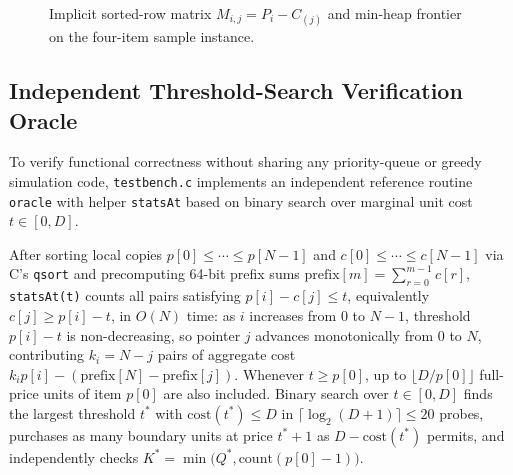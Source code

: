 \documentclass[10pt, a4paper]{article}
\newcommand{\code}[1]{\texttt{\color{primary!90!black}#1}}
\newcommand{\id}[1]{\ensuremath{\mathrm{#1}}}
\begin{document}
\begin{figure}[H]
\caption{\footnotesize Implicit sorted-row matrix $M_{i,j} = P_i - C_{(j)}$ and min-heap frontier on the four-item sample instance.}
\label{fig:frontier_trace}
\end{figure}

\subsection{Independent Threshold-Search Verification Oracle}
To verify functional correctness without sharing any priority-queue or greedy simulation code, \code{testbench.c} implements an independent reference routine \code{oracle} with helper \code{statsAt} based on binary search over marginal unit cost $t \in [0, D]$.

After sorting local copies $p[0] \le \cdots \le p[N-1]$ and $c[0] \le \cdots \le c[N-1]$ via C's \code{qsort} and precomputing 64-bit prefix sums $\id{prefix}[m] = \sum_{r=0}^{m-1} c[r]$, \code{statsAt(t)} counts all pairs satisfying $p[i] - c[j] \le t$, equivalently $c[j] \ge p[i] - t$, in $O(N)$ time: as $i$ increases from $0$ to $N-1$, threshold $p[i] - t$ is non-decreasing, so pointer $j$ advances monotonically from $0$ to $N$, contributing $k_i = N - j$ pairs of aggregate cost $k_i p[i] - (\id{prefix}[N] - \id{prefix}[j])$. Whenever $t \ge p[0]$, up to $\lfloor D / p[0] \rfloor$ full-price units of item $p[0]$ are also included. Binary search over $t \in [0, D]$ finds the largest threshold $t^*$ with $\id{cost}(t^*) \le D$ in $\lceil \log_2(D + 1) \rceil \le 20$ probes, purchases as many boundary units at price $t^* + 1$ as $D - \id{cost}(t^*)$ permits, and independently checks $K^* = \min\bigl(Q^*, \id{count}(p[0] - 1)\bigr)$.
\end{document}
